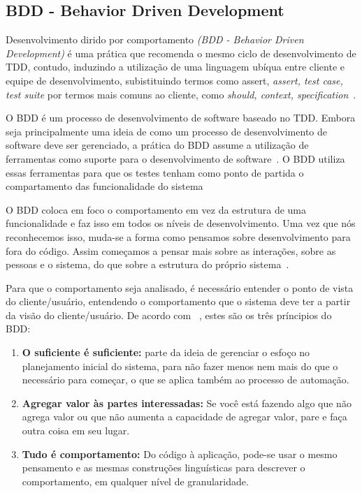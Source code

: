 \subsection{BDD - Behavior Driven Development}

Desenvolvimento dirido por comportamento \textit{(BDD - Behavior Driven Development)} 
é uma prática que recomenda o mesmo ciclo de desenvolvimento de TDD, contudo, induzindo 
a utilização de uma linguagem ubíqua entre cliente e equipe de desenvolvimento, subistituindo termos como assert, \textit{assert, test case, test suite} por termos 
mais comuns ao cliente, como \textit{should, context, specification}~\cite{bernardo2011}.

O BDD é um processo de desenvolvimento de software baseado no TDD. Embora seja 
principalmente uma ideia de como um processo de desenvolvimento de 
software deve ser gerenciado, a prática do BDD assume a utilização de ferramentas 
como suporte para o desenvolvimento de software~\cite{haring2011}. O BDD utiliza 
essas ferramentas para que os testes tenham como ponto de partida o compartamento 
das funcionalidade do sistema

O BDD coloca em foco o comportamento em vez da estrutura de uma funcionalidade e faz isso em todos os níveis de desenvolvimento. Uma vez que nós reconhecemos isso, muda-se a forma como pensamos sobre desenvolvimento para fora do código. Assim começamos a pensar mais sobre as interações, sobre as pessoas e o sistema, do que sobre a 
estrutura do próprio sistema~\cite{chelimsky2010}.

Para que o comportamento seja analisado, é necessário entender o ponto de vista do 
cliente/usuário, entendendo o comportamento que o sistema deve ter a partir da
visão do cliente/usuário. 
%
De acordo com ~, estes são os três príncipios do BDD:

\begin{enumerate}
\item \textbf{O suficiente é suficiente:} parte da ideia de gerenciar o esfoço no 
planejamento inicial do sistema, para não fazer menos nem mais do que o necessário 
para começar, o que se aplica também ao processo de automação.

\item \textbf{Agregar valor às partes interessadas:} Se você está fazendo algo que 
não agrega valor ou que não aumenta a capacidade de agregar valor, pare e faça outra 
coisa em seu lugar.

\item \textbf{Tudo é comportamento:} Do código à aplicação, pode-se usar o mesmo 
pensamento e as mesmas construções linguísticas para descrever o comportamento, em 
qualquer nível de granularidade. 
\end{enumerate}


